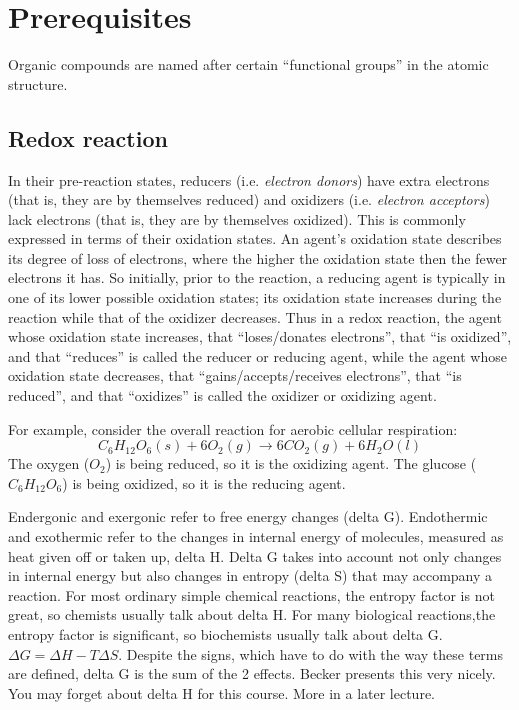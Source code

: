 \documentclass{article}
\begin{document}

\pagebreak
\section{Prerequisites}\label{sec_prerequisites}

Organic compounds are named after certain ``functional groups'' in the atomic structure.

\subsection{Redox reaction}
In their pre-reaction states, reducers (i.e. {\em electron donors\/}) have extra electrons
(that is, they are by themselves reduced) and oxidizers (i.e. {\em electron acceptors\/})
lack electrons (that is, they are by themselves oxidized). This is commonly expressed in
terms of their oxidation states. An agent's oxidation state describes its degree of loss
of electrons, where the higher the oxidation state then the fewer electrons it has. So
initially, prior to the reaction, a reducing agent is typically in one of its lower
possible oxidation states; its oxidation state increases during the reaction while that of
the oxidizer decreases. Thus in a redox reaction, the agent whose oxidation state
increases, that ``loses/donates electrons'', that ``is oxidized'', and that ``reduces'' is
called the reducer or reducing agent, while the agent whose oxidation state decreases,
that ``gains/accepts/receives electrons'', that ``is reduced'', and that ``oxidizes'' is
called the oxidizer or oxidizing agent.

For example, consider the overall reaction for aerobic cellular respiration:
\[
    C_6H_{12}O_6(s) + 6O_2(g) \rightarrow 6CO_2(g) + 6H_2O(l)
\]
The oxygen ($O_2$) is being reduced, so it is the oxidizing agent. The glucose
($C_6H_{12}O_6$) is being oxidized, so it is the reducing agent.

Endergonic and exergonic refer to free energy changes (delta G). Endothermic and
exothermic refer to the changes in internal energy of molecules, measured as heat given
off or taken up, delta H. Delta G takes into account not only changes in internal energy
but also changes in entropy (delta S) that may accompany a reaction. For most ordinary
simple chemical reactions, the entropy factor is not great, so chemists usually talk about
delta H. For many biological reactions,the entropy factor is significant, so biochemists
usually talk about delta G. $\Delta G = \Delta H - T \Delta S $. Despite the signs, which
have to do with the way these terms are defined, delta G is the sum of the 2 effects.
Becker presents this very nicely. You may forget about delta H for this course. More in a
later lecture.
\end{document}
